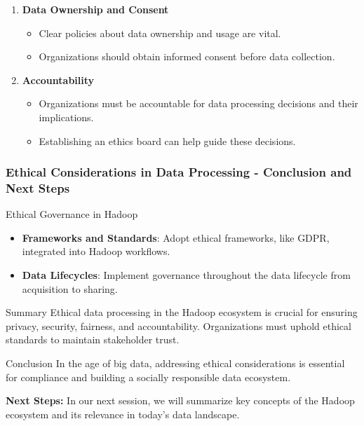 \documentclass[aspectratio=169]{beamer}
\begin{document}
\begin{frame}[fragile]
\begin{enumerate}
        \item \textbf{Data Ownership and Consent} 
            \begin{itemize}
                \item Clear policies about data ownership and usage are vital.
                \item Organizations should obtain informed consent before data collection.
            \end{itemize}

        \item \textbf{Accountability} 
            \begin{itemize}
                \item Organizations must be accountable for data processing decisions and their implications.
                \item Establishing an ethics board can help guide these decisions.
            \end{itemize}
    \end{enumerate}
\end{frame}

\begin{frame}[fragile]
    \frametitle{Ethical Considerations in Data Processing - Conclusion and Next Steps}
    \begin{block}{Ethical Governance in Hadoop}
        \begin{itemize}
            \item \textbf{Frameworks and Standards}: Adopt ethical frameworks, like GDPR, integrated into Hadoop workflows.
            \item \textbf{Data Lifecycles}: Implement governance throughout the data lifecycle from acquisition to sharing.
        \end{itemize}
    \end{block}
    
    \begin{block}{Summary}
        Ethical data processing in the Hadoop ecosystem is crucial for ensuring privacy, security, fairness, and accountability. Organizations must uphold ethical standards to maintain stakeholder trust.
    \end{block}
    
    \begin{block}{Conclusion}
        In the age of big data, addressing ethical considerations is essential for compliance and building a socially responsible data ecosystem.
    \end{block}
    
    \textbf{Next Steps:} In our next session, we will summarize key concepts of the Hadoop ecosystem and its relevance in today's data landscape.
\end{frame}
\end{document}

